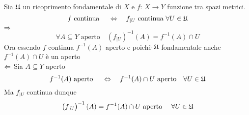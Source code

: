 \spazio
\begin{prop}Sia $\mathfrak{U}$ un ricoprimento fondamentale di $X$ e $f:\, X \to Y$ funzione tra spazi metrici.
$$ f \text{ continua } \quad \Leftrightarrow \quad f_{\vert U } \text{ continua } \forall U \in \mathfrak{U} $$
\proof $\Rightarrow$ $$ \forall A \subseteq Y\text{ aperto} \quad 
\left( f_{\vert U } \right)^{-1}(A) = f^{-1}(A) \cap U $$
Ora essendo $f$ continua $f^{-1}(A)$ aperto e poich\`e $\mathfrak{U}$ fondamentale anche $f^{-1}(A) \cap U $ \`e un aperto \\
$\Leftarrow$ Sia $A\subseteq Y$ aperto 
$$ f^{-1}(A) \text{ aperto } \quad \Leftrightarrow \quad f^{-1}(A) \cap U \text{ aperto} \quad \forall U \in \mathfrak{U} $$
Ma $f_{\vert U} $ continua dunque
$$ \left( f_{\vert U } \right)^{-1}(A) = f^{-1}(A) \cap U \text{ aperto }\quad \forall U \in \mathfrak{U}$$
\endproof
\end{prop}
